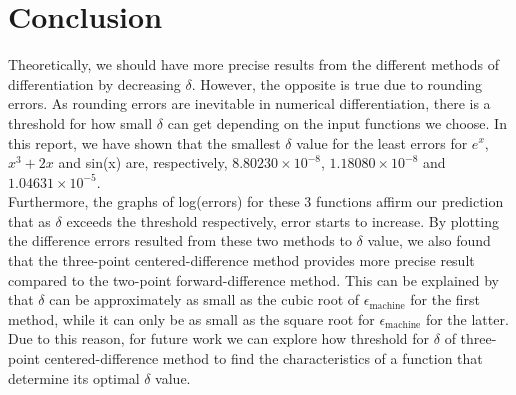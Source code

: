 \documentclass{article}
\begin{document}
\vspace{-10mm}

\section*{Conclusion}
Theoretically, we should have more precise results from the different methods of differentiation by decreasing $\delta$. However, the opposite is true due to rounding errors. As rounding errors are inevitable in numerical differentiation, there is a threshold for how small $\delta$ can get depending on the input functions we choose. In this report, we have shown that the smallest $\delta$ value for the least errors for $e^x$, $x^3 + 2x$ and sin(x) are, respectively, $8.80230 \times 10^{-8}$, $1.18080 \times 10^{-8}$ and $1.04631 \times 10^{-5}$.  \\

\noindent Furthermore, the graphs of log(errors) for these 3 functions affirm our prediction that as $\delta$ exceeds the threshold respectively, error starts to increase. By plotting the difference errors resulted from these two methods to $\delta$ value, we also found that the three-point centered-difference method provides more precise result compared to the two-point forward-difference method. This can be explained by that $\delta$ can be approximately as small as the cubic root of $\epsilon_{\text{machine}}$ for the first method, while it can only be as small as the square root for $\epsilon_{\text{machine}}$ for the latter. Due to this reason, for future work we can explore how threshold for $\delta$ of three-point centered-difference method to find the characteristics of a function that determine its optimal $\delta$ value.
\end{document}
